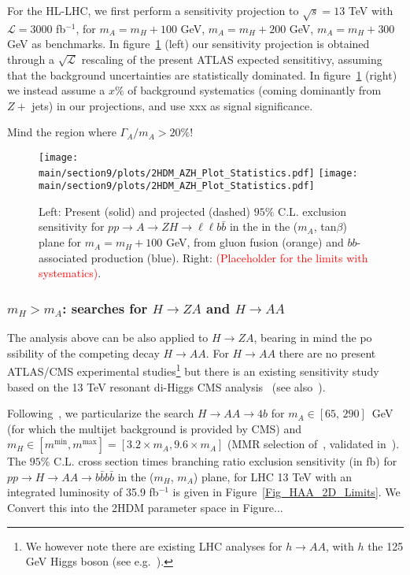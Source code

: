 \documentclass[../report.tex]{subfiles}
\providecommand{\main}{..}
\begin{document}
For the HL-LHC, we first perform a sensitivity projection to $\sqrt{s} = 13$ TeV with $\mathcal{L} = 3000$ fb$^{-1}$, for $m_A = m_H + 100$ GeV, $m_A = m_H + 200$ GeV, $m_A = m_H + 300$ GeV as benchmarks. 
In figure~\ref{AZH_HL-LHC} (left) our sensitivity projection is obtained through a $\sqrt{\mathcal{L}}$ rescaling of the present ATLAS expected 
sensititivy, assuming that the background uncertainties are statistically dominated. In figure~\ref{AZH_HL-LHC} (right) we instead assume a $x\%$ of background systematics (coming dominantly from $Z +$ jets) in our projections, and use xxx as signal significance.

Mind the region where $\Gamma_A/m_A > 20\%$!

\begin{figure}[h]
\begin{center}
\texttt{[image: \\main/section9/plots/2HDM\_AZH\_Plot\_Statistics.pdf]}
\texttt{[image: \\main/section9/plots/2HDM\_AZH\_Plot\_Statistics.pdf]}
\caption{\small Left: Present (solid) and projected (dashed)  $95\%$ C.L. exclusion sensitivity for $p p \to A \to Z H \to \ell\ell b \bar{b}$ in the 
in the ($m_{A}$, tan$\beta$) plane for $m_A = m_H +100$ GeV, from 
gluon fusion (orange) and $bb$-associated production (blue). Right: \textcolor{red}{(Placeholder for the limits with systematics)}.}
\label{AZH_HL-LHC}
\end{center}
\end{figure}


\subsubsection{$m_H > m_A$: searches for $H \to Z A$ and $H \to A A$}

The analysis above can be also applied to $H \to Z A$, bearing in mind the po
ssibility of the competing decay $H \to A A$. For $H \to A A$ there are no present ATLAS/CMS experimental studies\footnote{We however note there are existing LHC analyses for $h \to A A$, with $h$ the 125 GeV Higgs boson (see e.g.~\cite{Khachatryan:2017mnf}).} but there is an existing sensitivity study~\cite{Brooijmans:2018xbu} based on the 13 TeV 
resonant di-Higgs CMS analysis~\cite{CMS:2017xxp} (see also~\cite{CMS:2016tlj}).

Following~\cite{Brooijmans:2018xbu}, we particularize the search $H\to A A \to 4 b$ for $m_{A} \in [65,\, 290]$~GeV (for which the multijet background is provided by CMS) and $m_{H} \in [m^{\mathrm{min}}, m^{\mathrm{max}}] = [3.2\times m_{A}, 9.6\times m_{A}]$ (MMR selection of~\cite{CMS:2017xxp}, validated in~\cite{Brooijmans:2018xbu}). The $95\%$ C.L. cross section times branching ratio exclusion sensitivity (in fb) for $p p \to H \to A A \to b \bar{b} b \bar{b}$ in the ($m_{H}$, $m_{A}$) plane, for LHC 13 TeV with an integrated luminosity of 35.9 fb$^{-1}$ is given in 
Figure~\ref{Fig_HAA_2D_Limits}. We Convert this into the 2HDM parameter space in Figure... 
\end{document}

